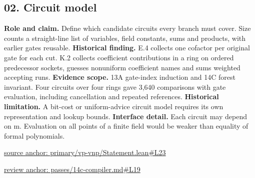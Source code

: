 \documentclass[11pt,letterpaper]{article}
\theoremstyle{definition}\newtheorem{definition}[theorem]{Definition}\newtheorem{example}[theorem]{Example}
\theoremstyle{remark}\newtheorem{remark}[theorem]{Remark}
\begin{document}
\subsection*{02. Circuit model}
\textbf{Role and claim.} Define which candidate circuits every branch must cover. Size counts a straight-line list of variables, field constants, sums and products, with earlier gates reusable.
\textbf{Historical finding.} E.4 collects one cofactor per original gate for each cut. K.2 collects coefficient contributions in a ring on ordered predecessor sockets, guesses nonuniform coefficient names and sums weighted accepting runs.
\textbf{Evidence scope.} 13A gate-index induction and 14C forest invariant. Four circuits over four rings gave 3,640 comparisons with gate evaluation, including cancellation and repeated references.
\textbf{Historical limitation.} A bit-cost or uniform-advice circuit model requires its own representation and lookup bounds.
\textbf{Interface detail.} Each circuit may depend on m. Evaluation on all points of a finite field would be weaker than equality of formal polynomials.
\par\href{https://github.com/nousentllc/VP-VNP-Review/blob/8a7976933b6b2b4ffda1ad3a0dfb5fc6b6f023e8/primary/vp-vnp/Statement.lean\#L23}{source anchor: primary/vp-vnp/Statement.lean\#L23}
\par\href{https://github.com/nousentllc/VP-VNP-Review/blob/8a7976933b6b2b4ffda1ad3a0dfb5fc6b6f023e8/passes/14c-compiler.md\#L19}{review anchor: passes/14c-compiler.md\#L19}
\goodbreak
{}
\hypertarget{claim.03}{}
\end{document}
